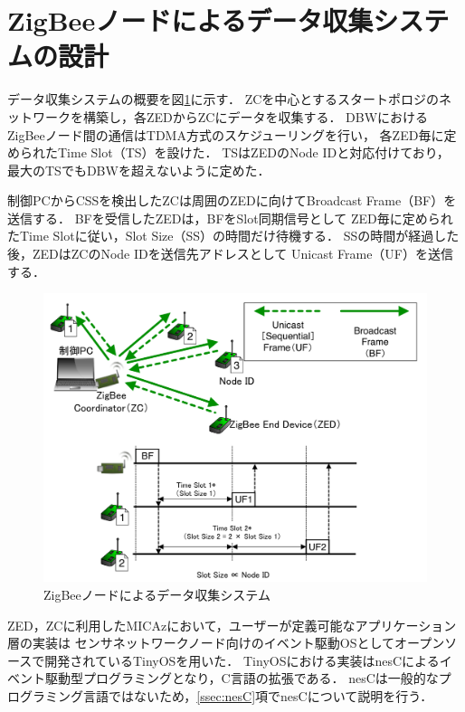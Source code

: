 \documentclass[12pt]{jreport}
\begin{document}
\section{ZigBeeノードによるデータ収集システムの設計}
\label{sec:collecting_system}

データ収集システムの概要を図\ref{fig:aacts_snw}に示す．
ZCを中心とするスタートポロジのネットワークを構築し，各ZEDからZCにデータを収集する．
DBWにおけるZigBeeノード間の通信はTDMA方式のスケジューリングを行い，
各ZED毎に定められたTime Slot（TS）を設けた．
TSはZEDのNode IDと対応付けており，
最大のTSでもDBWを超えないように定めた．

制御PCからCSSを検出したZCは周囲のZEDに向けてBroadcast Frame（BF）を送信する．
BFを受信したZEDは，BFをSlot同期信号として
ZED毎に定められたTime Slotに従い，Slot Size（SS）の時間だけ待機する．
SSの時間が経過した後，ZEDはZCのNode IDを送信先アドレスとして
Unicast Frame（UF）を送信する．

\begin{figure}[bt]
 \centering
 \includegraphics[width=\columnwidth]{figure/aacts_snw.pdf}
 \caption{ZigBeeノードによるデータ収集システム}
 \label{fig:aacts_snw}
\end{figure}

ZED，ZCに利用したMICAzにおいて，ユーザーが定義可能なアプリケーション層の実装は
センサネットワークノード向けのイベント駆動OSとしてオープンソースで開発されているTinyOSを用いた．
TinyOSにおける実装はnesCによるイベント駆動型プログラミングとなり，C言語の拡張である．
nesCは一般的なプログラミング言語ではないため，\ref{ssec:nesC}項でnesCについて説明を行う．
\end{document}
